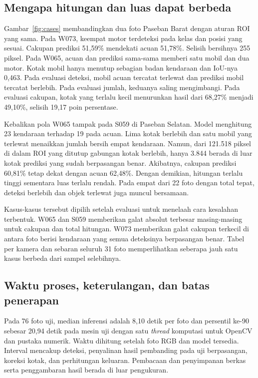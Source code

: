 \documentclass[conference,a4paper]{IEEEtran}
\begin{document}
\subsection{Mengapa hitungan dan luas dapat berbeda}
Gambar~\ref{fig:cases} membandingkan dua foto Paseban Barat dengan aturan ROI yang sama. Pada W073, keempat motor terdeteksi pada kelas dan posisi yang sesuai. Cakupan prediksi 51,59\% mendekati acuan 51,78\%. Selisih bersihnya 255 piksel. Pada W065, acuan dan prediksi sama-sama memberi satu mobil dan dua motor. Kotak mobil hanya menutup sebagian badan kendaraan dan IoU-nya 0,463. Pada evaluasi deteksi, mobil acuan tercatat terlewat dan prediksi mobil tercatat berlebih. Pada evaluasi jumlah, keduanya saling mengimbangi. Pada evaluasi cakupan, kotak yang terlalu kecil menurunkan hasil dari 68,27\% menjadi 49,10\%, selisih 19,17 poin persentase.



Kebalikan pola W065 tampak pada S059 di Paseban Selatan. Model menghitung 23 kendaraan terhadap 19 pada acuan. Lima kotak berlebih dan satu mobil yang terlewat menaikkan jumlah bersih empat kendaraan. Namun, dari 121.518 piksel di dalam ROI yang ditutup gabungan kotak berlebih, hanya 3.844 berada di luar kotak prediksi yang sudah berpasangan benar. Akibatnya, cakupan prediksi 60,81\% tetap dekat dengan acuan 62,48\%. Dengan demikian, hitungan terlalu tinggi sementara luas terlalu rendah. Pada empat dari 22 foto dengan total tepat, deteksi berlebih dan objek terlewat juga muncul bersamaan.

Kasus-kasus tersebut dipilih setelah evaluasi untuk menelaah cara kesalahan terbentuk. W065 dan S059 memberikan galat absolut terbesar masing-masing untuk cakupan dan total hitungan. W073 memberikan galat cakupan terkecil di antara foto berisi kendaraan yang semua deteksinya berpasangan benar. Tabel per kamera dan sebaran seluruh 31 foto memperlihatkan seberapa jauh satu kasus berbeda dari sampel selebihnya.

\subsection{Waktu proses, keterulangan, dan batas penerapan}
Pada 76 foto uji, median inferensi adalah 8,10 detik per foto dan persentil ke-90 sebesar 20,94 detik pada mesin uji dengan satu \textit{thread} komputasi untuk OpenCV dan pustaka numerik. Waktu dihitung setelah foto RGB dan model tersedia. Interval mencakup deteksi, penyalinan hasil pembanding pada uji berpasangan, koreksi kotak, dan perhitungan keluaran. Pembacaan dan penyimpanan berkas serta penggambaran hasil berada di luar pengukuran.
\end{document}
